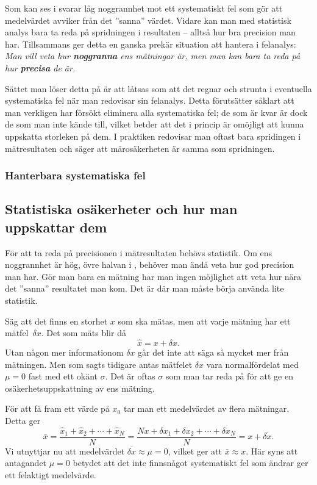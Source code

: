 \documentclass[11pt,a4paper, english, swedish
]{article}
\begin{document}
Som kan ses i  svarar låg noggrannhet mot ett
systematiskt fel som gör att medelvärdet avviker från det ''sanna''
värdet. Vidare kan man med statistisk analys bara ta reda på
spridningen i resultaten -- alltså hur bra precision man
har. Tillsammans ger detta en ganska prekär situation att hantera i
felanalys: 
\emph{Man vill veta hur {\bf noggranna} ens mätningar är, men man kan bara
  ta reda på hur {\bf precisa} de är.} 

Sättet man löser detta på är att låtsas som att det regnar och strunta
i eventuella systematiska fel när man redovisar sin felanalys. Detta
förutsätter såklart att man verkligen har försökt eliminera alla
systematiska fel; de som är kvar är dock de som man inte kände till,
vilket betder att det i princip är omöjligt att kunna uppskatta
storleken på dem. I praktiken redovisar man oftast bara spridingen i
mätresultaten och säger att märosäkerheten är samma som spridningen. 

\subsubsection{Hanterbara systematiska fel}



\subsection{Statistiska osäkerheter och hur man uppskattar dem}
För att ta reda på precisionen i mätresultaten behövs statistik. Om
ens noggrannhet är hög, övre halvan i , behöver
man ändå veta hur god precision man har. Gör man bara en mätning har
man ingen möjlighet att veta hur nära det ''sanna'' resultatet man
kom. Det är där man måste börja använda lite statistik. 

Säg att det finns en storhet $x$ som ska mätas, men att varje mätning
har ett mätfel~$\delta{x}$. Det som mäts blir då
\begin{equation}
\hat{x}=x+\delta{x}.
\end{equation}
Utan någon mer informationom $\delta{x}$ går det inte att säga så mycket mer
från mätningen. Men som sagts tidigare antas mätfelet $\delta{x}$ vara
normalfördelat med $\mu=0$ fast med ett okänt $\sigma$. Det är oftas
$\sigma$ som man tar reda på för att ge en osäkerhetsuppskattning av
ens mätning. 

För att få fram ett värde på $x_0$ tar man ett medelvärdet av flera
mätningar. Detta ger
\begin{equation}
\bar{x}=\frac{\hat{x}_1+\hat{x}_2 + \cdots + \hat{x}_N}{N} 
= \frac{Nx+\delta{x}_1+\delta{x}_2 + \cdots + \delta{x}_N}{N}
= x + \overline{\delta{x}}.
\end{equation}
Vi utnyttjar nu att medelvärdet
$\overline{\delta{x}}\approx\mu=0$, vilket ger att $\bar{x}\approx x$.
Här syns att antagandet $\mu=0$ betydet att det inte finnsnågot
systematiskt fel som ändrar ger ett felaktigt medelvärde.
\end{document}
